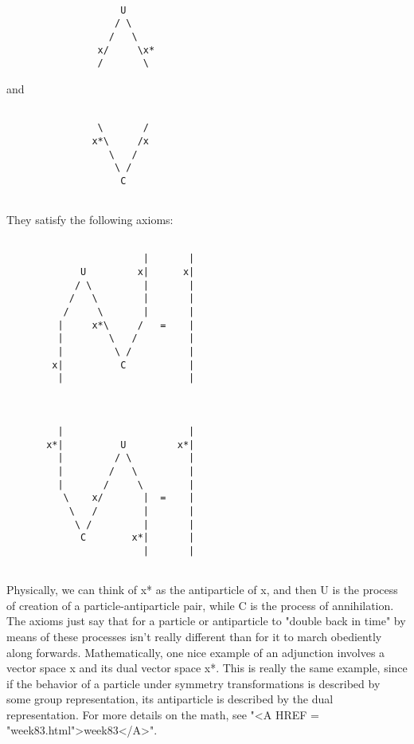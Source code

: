\begin{verbatim}

                    U
                   / \
                  /   \
                x/     \x*
                /       \

\end{verbatim}
    
and


\begin{verbatim}

                \       /
               x*\     /x
                  \   / 
                   \ /
                    C


\end{verbatim}
    
They satisfy the following axioms:


\begin{verbatim}

                        |       |
             U         x|      x|
            / \         |       |
           /   \        |       |
          /     \       |       |
         |     x*\     /   =    | 
         |        \   /         |
         |         \ /          |
        x|          C           |
         |                      |



         |                      |
       x*|          U         x*|
         |         / \          |
         |        /   \         |
         |       /     \        |
          \    x/       |  =    | 
           \   /        |       |
            \ /         |       |
             C        x*|       |
                        |       |


\end{verbatim}
    
Physically, we can think of x* as the antiparticle of x, and then U is
the process of creation of a particle-antiparticle pair, while C is the
process of annihilation.  The axioms just say that for a particle or
antiparticle to "double back in time" by means of these processes isn't
really different than for it to march obediently along forwards. 
Mathematically, one nice example of an adjunction involves a vector
space x and its dual vector space x*.  This is really the same example,
since if the behavior of a particle under symmetry transformations is
described by some group representation, its antiparticle is described by
the dual representation.  For more details on the math, see "<A HREF = "week83.html">week83</A>".

